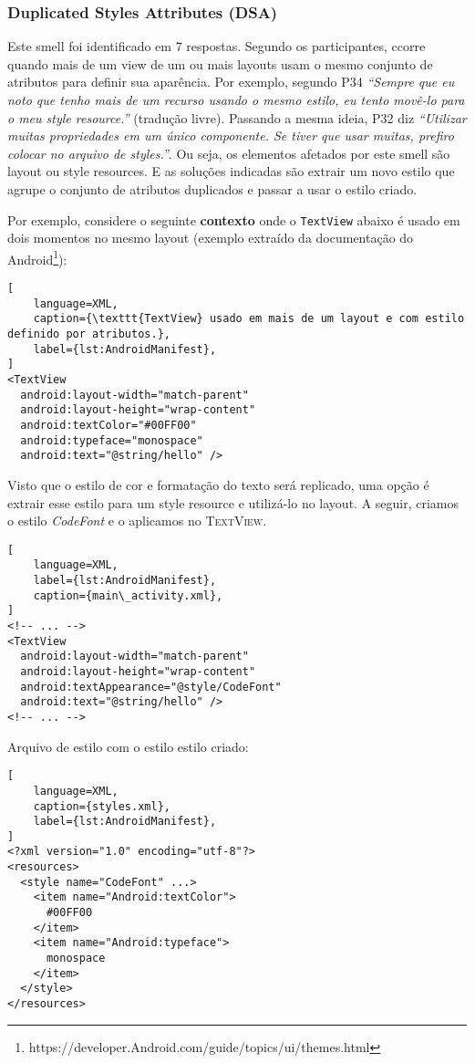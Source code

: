 \subsubsection{Duplicated Styles Attributes (DSA)}
Este smell foi identificado em 7 respostas. Segundo os participantes, ccorre quando mais de um view de um ou mais layouts usam o mesmo conjunto de atributos para definir sua apar\^encia. Por exemplo, segundo P34 \textit{``Sempre que eu noto que tenho mais de um recurso usando o mesmo estilo, eu tento mov\^e-lo para o meu \textit{style resource}.''} (tradu\c{c}\~ao livre). Passando a mesma ideia, P32 diz \textit{``Utilizar muitas propriedades em um \'unico componente. Se tiver que usar muitas, prefiro colocar no arquivo de styles.''}. Ou seja, os elementos afetados por este smell s\~ao layout ou style resources. E as solu\c{c}\~oes indicadas s\~ao extrair um novo estilo que agrupe o conjunto de atributos duplicados e passar a usar o estilo criado.

Por exemplo, considere o seguinte \textbf{contexto} onde o \texttt{TextView} abaixo \'e usado em dois momentos no mesmo layout (exemplo extra\'ido da documenta\c{c}\~ao do Android\footnote{https://developer.Android.com/guide/topics/ui/themes.html}):

\begin{lstlisting}[
	language=XML, 
	caption={\texttt{TextView} usado em mais de um layout e com estilo definido por atributos.}, 
	label={lst:AndroidManifest},
]
<TextView
  android:layout-width="match-parent"
  android:layout-height="wrap-content"
  android:textColor="#00FF00"
  android:typeface="monospace"
  android:text="@string/hello" />
\end{lstlisting}

Visto que o estilo de cor e formata\c{c}\~ao do texto ser\'a replicado, uma op\c{c}\~ao \'e extrair esse estilo para um style resource e utiliz\'a-lo no layout. A seguir, criamos o estilo \textit{CodeFont} e o aplicamos no \textsc{TextView}.

\begin{lstlisting}[
	language=XML, 
	label={lst:AndroidManifest},
	caption={main\_activity.xml},
]
<!-- ... -->
<TextView
  android:layout-width="match-parent"
  android:layout-height="wrap-content"
  android:textAppearance="@style/CodeFont"
  android:text="@string/hello" />
<!-- ... -->
\end{lstlisting}

Arquivo de estilo com o estilo estilo  criado:

\begin{lstlisting}[
	language=XML, 
	caption={styles.xml}, 
	label={lst:AndroidManifest},
]
<?xml version="1.0" encoding="utf-8"?>
<resources>
  <style name="CodeFont" ...>
    <item name="Android:textColor">
      #00FF00
    </item>
    <item name="Android:typeface">
      monospace
    </item>
  </style>
</resources>
\end{lstlisting}


